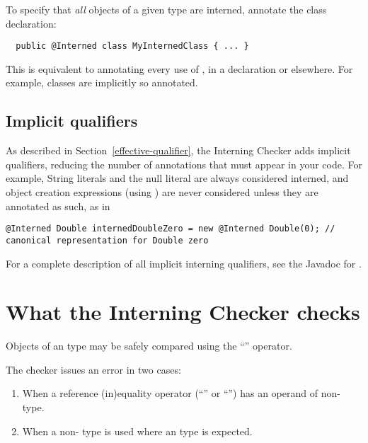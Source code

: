 To specify that \emph{all} objects of a given type are interned, annotate the
class declaration:

\begin{Verbatim}
  public @Interned class MyInternedClass { ... }
\end{Verbatim}

This is equivalent to annotating every use of , in a
declaration or elsewhere.  For example,  classes are implicitly
so annotated.


\subsection{Implicit qualifiers\label{interning-implicit-qualifiers}}

As described in Section~\ref{effective-qualifier}, the Interning Checker
adds implicit qualifiers, reducing the number of annotations that must
appear in your code.
For example, String literals and the null literal are always considered interned, and
object creation expressions (using ) are never considered
 unless they are annotated as such, as in

\begin{smaller}
\begin{Verbatim}
@Interned Double internedDoubleZero = new @Interned Double(0); // canonical representation for Double zero
\end{Verbatim}
\end{smaller}

For a complete description of all implicit interning qualifiers, see the
Javadoc for .


\section{What the Interning Checker checks\label{interning-checks}}

Objects of an  type may be safely compared using the ``\code{==}''
operator.

The checker issues an error in two cases:

\begin{enumerate}

\item
  When a reference (in)equality operator (``\code{==}'' or ``\code{!=}'')
  has an operand of non- type.

\item
  When a non- type is used where an  type
  is expected.

\end{enumerate}


